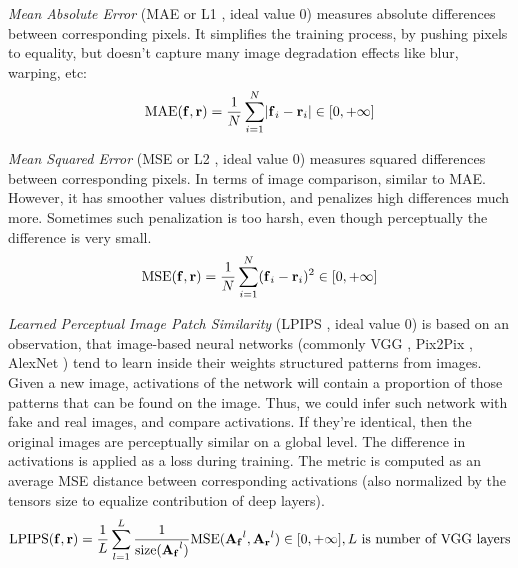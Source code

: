 \textit{Mean Absolute Error} (MAE or L1 \cite{metric:l1-95}, ideal value 0) measures absolute differences between corresponding pixels. It simplifies the training process, by pushing pixels to equality, but doesn't capture many image degradation effects like blur, warping, etc: 
\begin{equation}
	\setlength\abovedisplayskip{2pt}\text{MAE}(\bmr{f}, \bmr{r}) = \frac{1}{N}\sum_{i=1}^{N}\lvert \bmr{f}_i - \bmr{r}_i \rvert \in [0, +\infty]\setlength\belowdisplayskip{2pt}
\end{equation}

\textit{Mean Squared Error} (MSE or L2 \cite{metric:l1-95}, ideal value 0) measures squared differences between corresponding pixels. In terms of image comparison, similar to MAE. However, it has smoother values distribution, and penalizes high differences much more. Sometimes such penalization is too harsh, even though perceptually the difference is very small. 
\begin{equation}
	\setlength\abovedisplayskip{2pt}\text{MSE}(\bmr{f}, \bmr{r}) = \frac{1}{N}\sum_{i=1}^{N}(\bmr{f}_i - \bmr{r}_i)^2 \in [0, +\infty]\setlength\belowdisplayskip{2pt}
\end{equation} 

\textit{Learned Perceptual Image Patch Similarity} (LPIPS \cite{metric:lpips18}, ideal value 0) is based on an observation, that image-based neural networks (commonly VGG \cite{dnn:vgg14}, Pix2Pix \cite{dnn:pix2pix17}, AlexNet \cite{dnn:alexnet12}) tend to learn inside their weights structured patterns from images. Given a new image, activations of the network will contain a proportion of those patterns that can be found on the image. Thus, we could infer such network with fake and real images, and compare activations. If they're identical, then the original images are perceptually similar on a global level. The difference in activations is applied as a loss during training. The metric is computed as an average MSE distance between corresponding activations (also normalized by the tensors size to equalize contribution of deep layers).
\begin{equation}
	\setlength\abovedisplayskip{0pt} 
	\text{LPIPS}(\bmr{f}, \bmr{r}) = \frac{1}{L}\sum_{l=1}^L \frac{1}{\text{size}(\bmr{A_f}^l)}\text{MSE}(\bmr{A_f}^l, \bmr{A_r}^l) \in [0, +\infty], L \text{ is number of VGG layers} \setlength\belowdisplayskip{0pt}
\end{equation}
	
